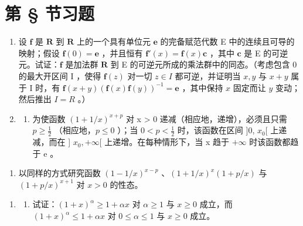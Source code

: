 \setcounter{exercisegroup}{0}
\section*{第 \S{} 节习题}
{}

\begin{enumerate}
\def\labelenumi{\arabic{enumi})}
\item
  设 \(\mathbf{f}\) 是 \(\mathbf{R}\) 到 \(\mathbf{R}\) 上的一个具有单位元 \(\mathbf{e}\) 的完备赋范代数 E 中的连续且可导的映射；假设 \(\mathbf{f}(0) = \mathbf{e}\) ，并且恒有 \(\mathbf{f}'(x) = \mathbf{f}(x)\mathbf{c}\) ，其中 \(\mathbf{c}\) 是 E 的可逆元。试证：\(\mathbf{f}\) 是加法群 \(\mathbf{R}\) 到 E 的可逆元所成的乘法群中的同态。（考虑包含 0 的最大开区间 I ，使得 \(\mathbf{f}(z)\) 对一切 \(z \in I\) 都可逆，并证明当 \(x, y\) 与 \(x + y\) 属于 I 时，有 \(\mathbf{f}(x + y)(\mathbf{f}(x)\mathbf{f}(y))^{-1} = \mathbf{e}\) ，其中保持 \(x\) 固定而让 \(y\) 变动；然后推出 \(I = R\) 。）
\item
  \begin{enumerate}
  \def\labelenumii{\alph{enumii})}
  \tightlist
  \item
    为使函数 \((1 + 1/x)^{x+p}\) 对 x \textgreater{} 0 递减（相应地，递增），必须且只需 \(p \geqslant \frac{1}{2}\) （相应地，\(p \leqslant 0\) ）；当 \(0 < p < \frac{1}{2}\) 时，该函数在区间 {]}0, \(x_{0}[\) 上递减，而在 {]} \(x_{0}, +\infty[\) 上递增。在每种情形下，当 x 趋于 \(+\infty\) 时该函数都趋于 e 。
  \end{enumerate}
\end{enumerate}

\begin{enumerate}
\def\labelenumi{\alph{enumi})}
\setcounter{enumi}{1}
\tightlist
\item
  以同样的方式研究函数 \((1 - 1 / x)^{x - p}\) 、\((1 + 1 / x)^{x}(1 + p / x)\) 与 \((1 + p / x)^{x + 1}\) 对 \(x > 0\) 的性态。
\end{enumerate}

\begin{enumerate}
\def\labelenumi{\arabic{enumi})}
\setcounter{enumi}{2}
\tightlist
\item
  \begin{enumerate}
  \def\labelenumii{\alph{enumii})}
  \tightlist
  \item
    试证：\((1+x)^{\alpha} \geqslant 1 + \alpha x\) 对 \(\alpha \geqslant 1\) 与 \(x \geqslant 0\) 成立，而 \((1+x)^{\alpha} \leqslant 1 + \alpha x\) 对 \(0 \leqslant \alpha \leqslant 1\) 与 \(x \geqslant 0\) 成立。
  \end{enumerate}
\end{enumerate}


